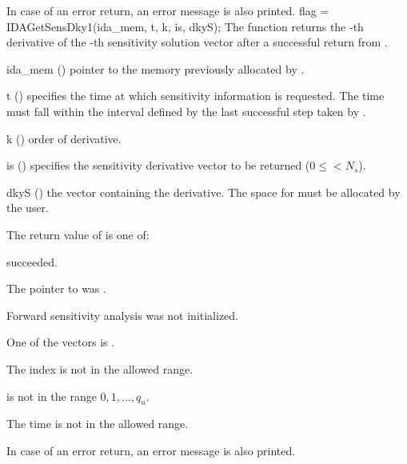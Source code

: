 {
  In case of an error return, an error message is also printed.  
}
{
  flag = IDAGetSensDky1(ida\_mem, t, k, is, dkyS);
}
{
  The function  returns the -th derivative of the 
  -th sensitivity solution vector after a successful return from .
}
{
  \begin{args}
  \item[ida\_mem] ()
    pointer to the memory previously allocated by .
  \item[t] ()
    specifies the time at which sensitivity information is 
    requested. The time  must fall within the interval defined by the last 
    successful step taken by {\idas}.
  \item[k] () order of derivative.
  \item[is] () specifies the sensitivity derivative vector to be returned
    ($0\le$$< N_s$).
  \item[dkyS] ()
    the vector containing the derivative. The space for  must be allocated by 
    the user. 
  \end{args}
}
{
  The return value  of  is one of:
  \begin{args}
  \item[\Id{IDA\_SUCCESS}] 
     succeeded.
  \item[\Id{IDA\_MEM\_NULL}] 
    The pointer to  was .
  \item[\Id{IDA\_NO\_SENS}] 
    Forward sensitivity analysis was not initialized.
  \item[\Id{IDA\_BAD\_DKY}] 
    One of the vectors  is .
  \item[\Id{IDA\_BAD\_IS}]
    The index  is not in the allowed range.
  \item[\Id{IDA\_BAD\_K}] 
     is not in the range $0, 1, ..., q_u$.
  \item[\Id{IDA\_BAD\_T}] 
    The time  is not in the allowed range.
  \end{args}
}
{
  In case of an error return, an error message is also printed.  
}

